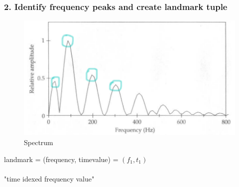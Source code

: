 \documentclass{beamer}
\begin{document}
\begin{frame}
\frametitle{2. Identify frequency peaks and create landmark tuple}
\begin{figure}
\includegraphics[scale=0.1]{pngs/05_spektrum.png} 
\caption{Spectrum}
\end{figure}
\begin{center}
landmark = (frequency, timevalue) = $(f_1, t_1)$\\
\ \\
"time idexed frequency value"
\end{center}
\end{frame}
\end{document}
